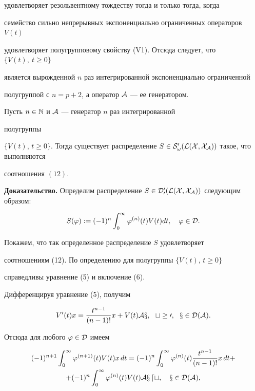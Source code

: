 удовлетворяет резольвентному тождеству тогда и только тогда, когда 


семейство сильно непрерывных экспоненциально ограниченных операторов $V(t)$ 


удовлетворяет полугрупповому свойству (V1). Отсюда следует, что $\{V(t),\ 


t\ge0\}$ 


является вырожденной $n$ раз интегрированной экспоненциально ограниченной 


полугруппой с $n=p+2$, а оператор $\cal A$ --- ее генератором. 


 


\begin{prop} 


Пусть $n\in\Bbb N$ и $\cal A$ --- генератор $n$ раз интегрированной 


полугруппы 


$\{V(t)$, $t\ge0\}$. Тогда существует распределение $S\in\cal S'_\omega(\cal 


L(X,X_{\cal A}))$ такое, что выполняются 


соотношения $(12)$. 


\end{prop} 


 


{\bf Доказательство.} Определим распределение $S\in\cal D'_0(\cal L(X,X_{\cal 


A}))$ следующим образом: 


$$ 


S(\varphi):=(-1)^n\int^\infty_0 \varphi^{(n)}(t)V(t)dt,\quad 


\varphi\in\cal D. 


$$ 


Покажем, что так определенное распределение $S$ удовлетворяет 


соотношениям (12). По определению для полугруппы $\{V(t)$, $t\ge0\}$


справедливы уравнение (5) и включение (6). 


Дифференцируя уравнение (5), получим 


$$ 


V'(t)x=\frac{t^{n-1}}{(n-1)!}x+V(t)\cal A x,\ \ t\ge0, 


\ \ x\in D(\cal A). 


$$ 


Отсюда для любого $\varphi\in\cal D$ имеем 


\begin{multline*} 


(-1)^{n+1}\int^\infty_0 \varphi^{(n+1)}(t)V(t)x\,dt= 


(-1)^n\int^\infty_0 \varphi^{(n)}(t)\frac{t^{n-1}}{(n-1)!}x\,dt+ \\+


(-1)^n\int^\infty_0 \varphi^{(n)}(t)V(t)\cal A x\,dt,\quad x\in D(\cal A),


\end{multline*} 


